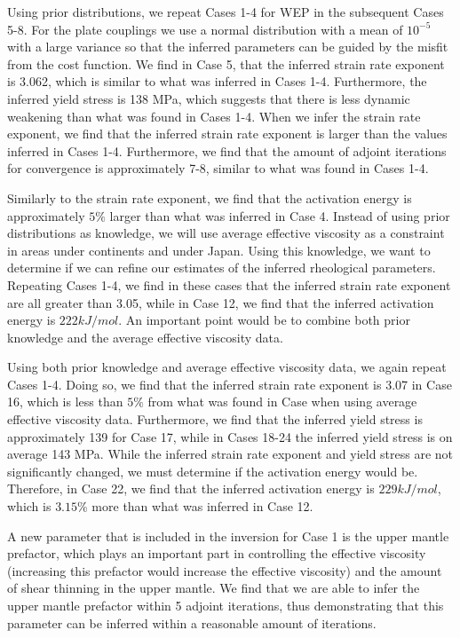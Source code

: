 \documentclass[12pt]{article}
\begin{document}
Using prior distributions, we repeat Cases 1-4 for WEP in the subsequent Cases 5-8.  For the plate couplings we use a normal distribution with a mean of $10^{-5}$ with a large variance so that the inferred parameters can be guided by the misfit from the cost function. We find in Case 5, that the inferred strain rate exponent is 3.062, which is similar to what was inferred in Cases 1-4. Furthermore, the inferred yield stress is 138 MPa, which suggests that there is less dynamic weakening than what was found in Cases 1-4. When we infer the strain rate exponent, we find that the inferred strain rate exponent is larger than the values inferred in Cases 1-4. Furthermore, we find that the amount of adjoint iterations for convergence is approximately 7-8, similar to what was found in Cases 1-4.

Similarly to the strain rate exponent, we find that the activation energy is approximately $5\%$ larger than what was inferred in Case 4. Instead of using prior distributions as knowledge, we will use average effective viscosity as a constraint in areas under continents and under Japan. Using this knowledge, we want to determine if we can refine our estimates of the inferred rheological parameters. Repeating Cases 1-4, we find in these cases that the inferred strain rate exponent are all greater than 3.05, while in Case 12, we find that the inferred activation energy is $222 kJ/mol$. An important point would be to combine both prior knowledge and the average effective viscosity data. 

Using both prior knowledge and average effective viscosity data, we again repeat Cases 1-4. Doing so, we  find that the inferred strain rate exponent is 3.07 in Case 16, which is less than $5\%$ from what was found in Case when using average effective viscosity data. Furthermore, we find that the inferred yield stress is approximately 139 for Case 17, while in Cases 18-24 the inferred yield stress is on average 143 MPa. While the inferred strain rate exponent and yield stress are not significantly changed, we must determine if the activation energy would be. Therefore, in Case 22, we find that the inferred activation energy is $229 kJ/mol$, which is $3.15 \%$ more than what was inferred in Case 12. 


A new parameter that is included in the inversion for Case 1 is the upper mantle prefactor, which plays an important part in controlling the effective viscosity (increasing this prefactor would increase the effective viscosity) and the amount of shear thinning in the upper mantle. We find that we are able to infer the upper mantle prefactor within 5 adjoint iterations, thus demonstrating that this parameter can be inferred within a reasonable amount of iterations.
\end{document}
